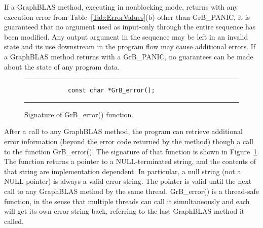 If a GraphBLAS method, executing in nonblocking mode, returns with
any execution error from Table~\ref{Tab:ErrorValues}(b) other than
{\sf GrB\_PANIC}, it is guaranteed that no argument used as input-only
through the entire sequence has been modified.  Any output argument in
the sequence may be left in an invalid state and its use downstream in the
program flow may cause additional errors.  If a GraphBLAS method returns
with a {\sf GrB\_PANIC}, no guarantees can be made about the state of
any program data.

\begin{figure}[tb]
	\hrule
	\vspace{1\baselineskip}
	\begin{center}
		\begin{minipage}{3in}
			\begin{verbatim}
			const char *GrB_error();
			\end{verbatim}
		\end{minipage}
	\end{center}
	\caption{Signature of {\sf GrB\_error()} function.}
	\label{Fig:GrB_error}
	\hrule
\end{figure}

After a call to any GraphBLAS method, the program can retrieve additional
error information (beyond the error code returned by the method) though a
call to the function {\sf GrB\_error()}. The signature of that function is
shown in Figure~\ref{Fig:GrB_error}.  The function returns a pointer to a 
NULL-terminated string, and the contents of that string are implementation 
dependent. In particular, a null string (not a {\sf NULL} pointer) is always a valid error string.
The pointer is valid until the next call to any GraphBLAS method by the same thread.
{\sf GrB\_error()} is a thread-safe function, in the sense that multiple threads can
call it simultaneously and each will get its own error string back, referring to the
last GraphBLAS method it called.
